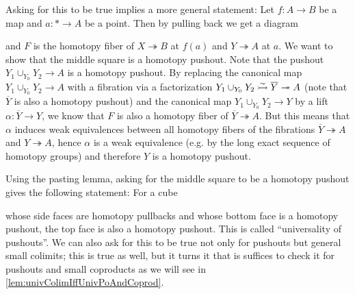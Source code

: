 Asking for this to be true implies a more general statement:
Let $f\colon A\to B$ be a map and $a\colon *\to A$ be a point.
Then by pulling back we get a diagram 
\begin{center}
\end{center}
and $F$ is the homotopy fiber of $X\twoheadrightarrow B$ at $f(a)$ and $Y\twoheadrightarrow A$ at $a$.
We want to show that the middle square is a homotopy pushout.
Note that the pushout $Y_1\cup_{Y_0}Y_2\to A$ is a homotopy pushout. 
By replacing the canonical map $Y_1\cup_{Y_0}Y_2\to A$ with a fibration via a factorization $Y_1\cup_{Y_0}Y_2\xtailrightarrow{\sim}\overline{Y}\twoheadrightarrow A$ (note that $\overline{Y}$ is also a homotopy pushout) and the canonical map $Y_1\cup_{Y_0}Y_2\to Y$ by a lift $\alpha\colon\overline{Y}\to Y$, we know that $F$ is also a homotopy fiber of $\overline{Y}\twoheadrightarrow A$.
But this means that $\alpha$ induces weak equivalences between all homotopy fibers of the fibrations $\overline{Y}\twoheadrightarrow A$ and $Y\twoheadrightarrow A$, hence $\alpha$ is a weak equivalence (e.g. by the long exact sequence of homotopy groups) and therefore $Y$ is a homotopy pushout.

Using the pasting lemma, asking for the middle square to be a homotopy pushout gives the following statement: 
For a cube 
\begin{center}
\end{center}
whose side faces are homotopy pullbacks and whose bottom face is a homotopy pushout, the top face is also a homotopy pushout.
This is called  ``universality of pushouts''.
We can also ask for this to be true not only for pushouts but general small colimits; this is true as well, but it turns it that is suffices to check it for pushouts and small coproducts as we will see in \cref{lem:univColimIffUnivPoAndCoprod}.

